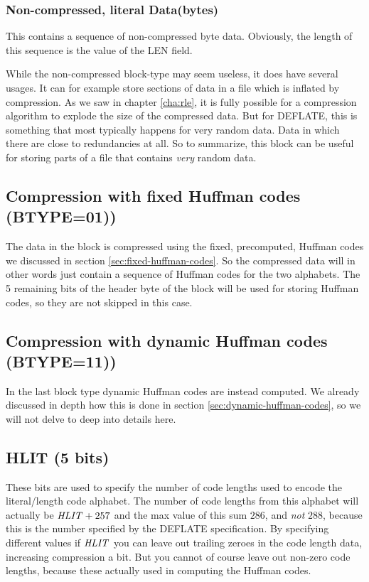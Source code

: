 \subsubsection{Non-compressed, literal Data(bytes)}

This contains a sequence of non-compressed byte data. Obviously, the
length of this sequence is the value of the LEN field.

While the non-compressed block-type may seem useless, it does have
several usages. It can for example store sections of data in a file
which is inflated by compression. As we saw in chapter \ref{cha:rle},
it is fully possible for a compression algorithm to explode the size
of the compressed data. But for DEFLATE, this is something that most
typically happens for very random data. Data in which there are close
to redundancies at all. So to summarize, this block can be useful for
storing parts of a file that contains \textit{very} random data.

\subsection{Compression with fixed Huffman codes (BTYPE=01))}

The data in the block is compressed using the fixed, precomputed,
Huffman codes we discussed in section
\ref{sec:fixed-huffman-codes}. So the compressed data will in other
words just contain a sequence of Huffman codes for the two
alphabets. The 5 remaining bits of the header byte of the block will
be used for storing Huffman codes, so they are not skipped in this
case.

\subsection{Compression with dynamic Huffman codes (BTYPE=11))}

In the last block type dynamic Huffman codes are instead computed. We
already discussed in depth how this is done in section
\ref{sec:dynamic-huffman-codes}, so we will not delve to deep into
details here.

\subsection{HLIT (5 bits)}

These bits are used to specify the number of code lengths used to
encode the literal/length code alphabet. The number of code lengths
from this alphabet will actually be $\mathit{HLIT} + 257$ and the max
value of this sum $286$, and \textit{not} $288$, because this is the
number specified by the DEFLATE specification. By specifying different
values if $\mathit{HLIT}$ you can leave out trailing zeroes in the code
length data, increasing compression a bit. But you cannot of course
leave out non-zero code lengths, because these actually used in
computing the Huffman codes.

